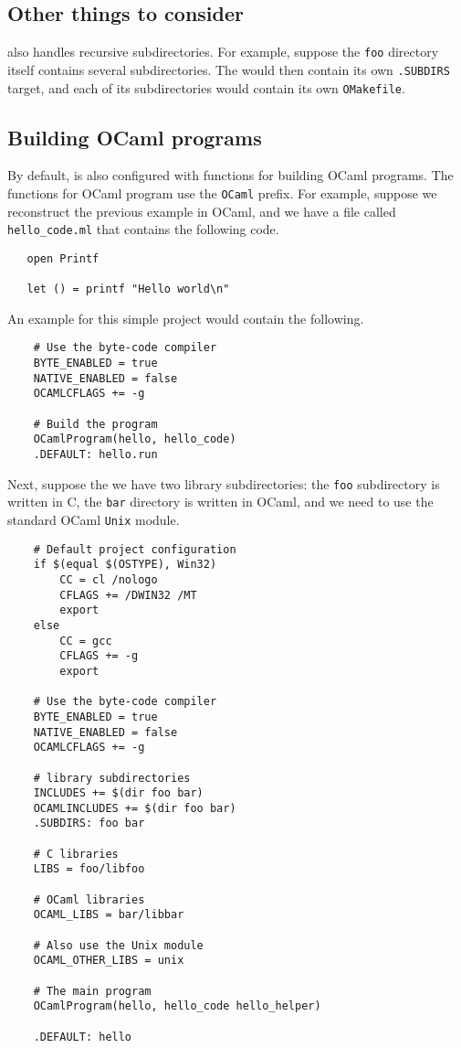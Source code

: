 \subsection{Other things to consider}

 also handles recursive subdirectories.  For example, suppose the \verb+foo+
directory itself contains several subdirectories.  The  would then
contain its own \verb+.SUBDIRS+ target, and each of its subdirectories would
contain its own \verb+OMakefile+.

\subsection{Building OCaml programs}

By default,  is also configured with functions for building OCaml programs.
The functions for OCaml program use the \verb+OCaml+ prefix.  For example, suppose
we reconstruct the previous example in OCaml, and we have a file called \verb+hello_code.ml+
that contains the following code.

\begin{verbatim}
   open Printf

   let () = printf "Hello world\n"
\end{verbatim}

An example  for this simple project would contain the following.

\begin{verbatim}
    # Use the byte-code compiler
    BYTE_ENABLED = true
    NATIVE_ENABLED = false
    OCAMLCFLAGS += -g

    # Build the program
    OCamlProgram(hello, hello_code)
    .DEFAULT: hello.run
\end{verbatim}

Next, suppose the we have two library subdirectories: the \verb+foo+ subdirectory
is written in C, the \verb+bar+ directory is written in OCaml, and we need to
use the standard OCaml \verb+Unix+ module.

\begin{verbatim}
    # Default project configuration
    if $(equal $(OSTYPE), Win32)
        CC = cl /nologo
        CFLAGS += /DWIN32 /MT
        export
    else
        CC = gcc
        CFLAGS += -g
        export

    # Use the byte-code compiler
    BYTE_ENABLED = true
    NATIVE_ENABLED = false
    OCAMLCFLAGS += -g

    # library subdirectories
    INCLUDES += $(dir foo bar)
    OCAMLINCLUDES += $(dir foo bar)
    .SUBDIRS: foo bar

    # C libraries
    LIBS = foo/libfoo

    # OCaml libraries
    OCAML_LIBS = bar/libbar

    # Also use the Unix module
    OCAML_OTHER_LIBS = unix

    # The main program
    OCamlProgram(hello, hello_code hello_helper)

    .DEFAULT: hello
\end{verbatim}

